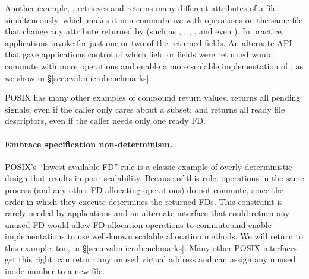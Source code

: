 Another example, , retrieves and returns many
different attributes of a file simultaneously, which makes it
non-commutative with operations on the same file that change any
attribute returned by  (such as , ,
, , and even ).  In practice,
applications invoke  for just one or two of the returned
fields. An alternate API that gave applications
control of which field or fields were returned
would commute with more operations and enable a more scalable
implementation of , as we show in
\S\ref{sec:eval:microbenchmarks}.

POSIX has many other examples of compound return values.
 returns all pending signals, even if the caller only
cares about a subset;
and  returns all ready file
descriptors, even if the caller needs only one ready FD.



\cbstart \paragraph{Embrace specification non-determinism.}

POSIX's ``lowest available FD'' rule is a classic example of
overly deterministic design that results in poor scalability.  \cbend
Because of this rule,  operations in the same process (and
any other FD allocating operations) do not commute, since the order in
which they execute determines the returned FDs.  This constraint is rarely
needed by applications and an alternate interface
that could return any
unused FD would allow FD allocation operations to commute and enable
implementations to use well-known scalable allocation methods.  We will
return to this example, too, in \S\ref{sec:eval:microbenchmarks}.
\cbstart Many other POSIX interfaces get this right:  can
return any unused virtual address and  can assign any unused
inode number to a new file.


